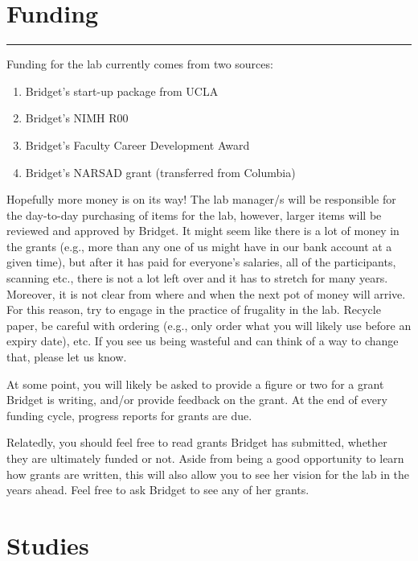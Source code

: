 \documentclass[]{book}
\providecommand{\tightlist}{%
  \setlength{\itemsep}{0pt}\setlength{\parskip}{0pt}}
\begin{document}
\hypertarget{funding}{%
\chapter{Funding}\label{funding}}

\begin{center}\rule{0.5\linewidth}{0.5pt}\end{center}

Funding for the lab currently comes from two sources:

\begin{enumerate}
\def\labelenumi{\arabic{enumi}.}
\tightlist
\item
  Bridget's start-up package from UCLA
\item
  Bridget's NIMH R00
\item
  Bridget's Faculty Career Development Award
\item
  Bridget's NARSAD grant (transferred from Columbia)
\end{enumerate}

Hopefully more money is on its way! The lab manager/s will be responsible for the day-to-day purchasing of items for the lab, however, larger items will be reviewed and approved by Bridget. It might seem like there is a lot of money in the grants (e.g., more than any one of us might have in our bank account at a given time), but after it has paid for everyone's salaries, all of the participants, scanning etc., there is not a lot left over and it has to stretch for many years. Moreover, it is not clear from where and when the next pot of money will arrive. For this reason, try to engage in the practice of frugality in the lab. Recycle paper, be careful with ordering (e.g., only order what you will likely use before an expiry date), etc. If you see us being wasteful and can think of a way to change that, please let us know.

At some point, you will likely be asked to provide a figure or two for a grant Bridget is writing, and/or provide feedback on the grant. At the end of every funding cycle, progress reports for grants are due.

Relatedly, you should feel free to read grants Bridget has submitted, whether they are ultimately funded or not. Aside from being a good opportunity to learn how grants are written, this will also allow you to see her vision for the lab in the years ahead. Feel free to ask Bridget to see any of her grants.

\hypertarget{studies}{%
\chapter{Studies}\label{studies}}
\end{document}
